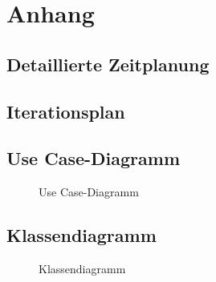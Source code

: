 \section{Anhang}
\subsection{Detaillierte Zeitplanung}
\label{app:Zeitplanung}



\clearpage

\subsection{Iterationsplan}
\label{app:Iterationsplan}


\clearpage

\subsection{Use Case-Diagramm}
\label{app:UseCase}
\begin{figure}[htb]
\centering
{}
\caption{Use Case-Diagramm}
\end{figure}


\clearpage


\clearpage


\clearpage


\clearpage

\clearpage

\subsection{Klassendiagramm}
\label{app:Klassendiagramm}
\begin{figure}[htb]
\centering
{}
\caption{Klassendiagramm}
\end{figure}
\clearpage
